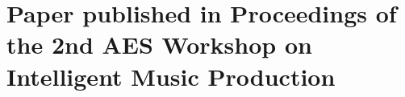 
\chapter{Paper published in Proceedings of the 2nd AES Workshop on Intelligent Music Production}
\label{appendix:jordal_paper}

